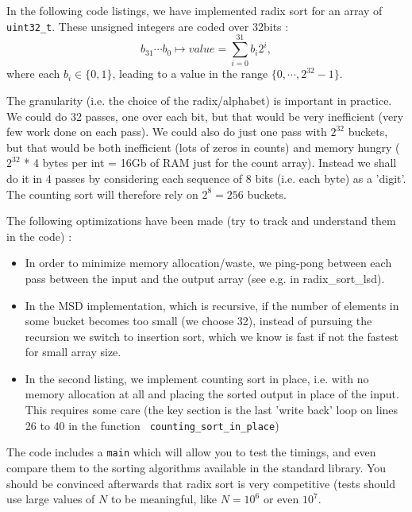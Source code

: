 \documentclass[12pt]{article}
\theoremstyle{plain}
\theoremstyle{remark}
\begin{document}
In the following code listings, we have implemented radix sort for an array of
{\tt uint32\_t}. These unsigned integers are coded over 32bits :
$$
b_{31}\cdots b_0 \mapsto value = \sum_{i=0}^{31} b_i 2^i,
$$
where each $b_i \in \{0, 1\}$, leading to a value in the range $\{0, \cdots,
2^{32} - 1\}$.

The granularity (i.e. the choice of the radix/alphabet) is important in practice. We could
do 32 passes, one over each bit, but that would be very inefficient (very few
work done on each pass). We could also do just one pass with $2^{32}$ buckets, 
but that would be both inefficient (lots of zeros in counts) and memory hungry 
($2^{32}$ * 4 bytes per int = 16Gb of RAM just for the count array).
Instead we shall do it in 4 passes by considering each sequence of 8 bits (i.e. each
byte) as a 'digit'. The counting sort will therefore rely on $2^8 = 256$ buckets.

\medskip

The following optimizations have been made (try to track and understand them in
the code) : 

\begin{itemize}
	\item In order to minimize memory allocation/waste, we ping-pong between
		each pass between the input and the output array (see e.g. in
		radix\_sort\_lsd).
	\item In the MSD implementation, which is recursive, if the
		number of elements in some bucket becomes too small (we choose 
		32), instead of pursuing the recursion we switch to insertion
		sort, which we know is fast if not the fastest for small array
		size.
	\item In the second listing, we implement counting sort in place, i.e.
		with no memory allocation at all and placing the sorted output
		in place of the input. This requires some care (the key section
		is the last 'write back' loop on lines 26 to 40 in the function {\tt
		counting\_sort\_in\_place})
\end{itemize}


The code includes a {\tt main} which will allow you to test the timings, and
even compare them to the sorting algorithms available in the standard library.
You should be convinced afterwards that radix sort is very competitive (tests
should use large values of $N$ to be meaningful, like $N = 10^6$ or even $10^7.$
\end{document}
